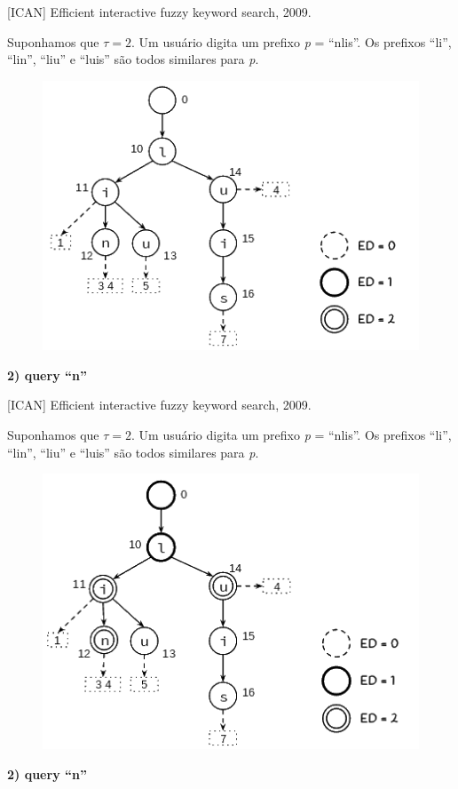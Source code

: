 \documentclass[11pt]{beamer}
\begin{document}
\begin{frame}{[ICAN] Efficient interactive fuzzy keyword search, 2009.}

    \small
    Suponhamos que $\tau = 2$. Um usuário digita um prefixo \textit{p} = ``nlis''. Os prefixos ``li'', ``lin'', ``liu'' e ``luis'' são todos similares para \textit{p}.
    
    \begin{figure}
      \includegraphics[scale=0.45]{pictures/ican_default.png}
      \centering
    \end{figure}
    
    \textbf{2) query ``n''}
    
\end{frame}

\begin{frame}{[ICAN] Efficient interactive fuzzy keyword search, 2009.}

    \small
    Suponhamos que $\tau = 2$. Um usuário digita um prefixo \textit{p} = ``nlis''. Os prefixos ``li'', ``lin'', ``liu'' e ``luis'' são todos similares para \textit{p}.
    
    \begin{figure}
      \includegraphics[scale=0.45]{pictures/ican_3.png}
      \centering
    \end{figure}
    
    \textbf{2) query ``n''}
    
\end{frame}
\end{document}
